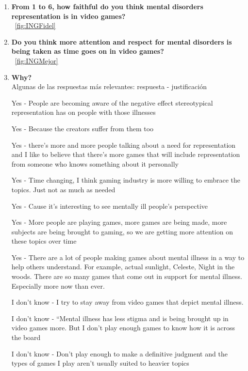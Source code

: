 \documentclass[12pt, a4paper,twoside,titlepage]{book}
\begin{document}
\begin{enumerate}[label=\textbf{\arabic*}.]
     
     \item \textbf{From 1 to 6, how faithful do you think mental disorders representation is in video games?}\\
    ~\ref{fig:INGFidel}
     \item \textbf{Do you think more attention and respect for mental disorders is being taken as time goes on in video games?}\\
    ~\ref{fig:INGMejor}
     \item \textbf{Why?}
     \label{mejorIngles}\\
     
     Algunas de las respuestas más relevantes: respuesta - justificación
     
    Yes - People are becoming aware of the negative effect stereotypical representation has on people with those illnesses
    
    Yes - Because the creators suffer from them too
    
    Yes - there's more and more people talking about a need for representation and I like to believe that there's more games that will include representation from someone who knows something about it personally
    
    Yes - Time changing, I think gaming industry is more willing to embrace the topics.  Just not as much as needed
    
    Yes - Cause it's interesting to see mentally ill people's perspective
    
    Yes - More people are playing games, more games are being made, more subjects are being brought to gaming, so we are getting more attention on these topics over time
    
    Yes - There are a lot of people making games about mental illness in a way to help others understand. For example, actual sunlight, Celeste, Night in the woods. There are so many games that come out in support for mental illness. Especially more now than ever.
    
    I don’t know - I try to stay away from video games that depict mental illness.
    
    I don’t know - ``Mental illness has less stigma and is being brought up in video games more. But I don't play enough games to know how it is across the board
    
    I don’t know - Don’t play enough to make a definitive judgment and the types of games I play aren’t usually suited to heavier topics

     
\end{enumerate}
\end{document}

